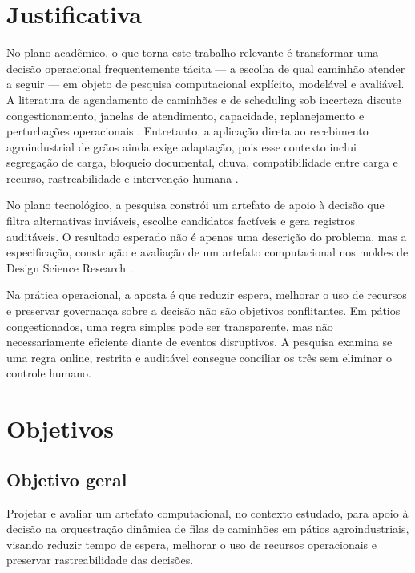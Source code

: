 \documentclass[
  12pt,
  oneside,
  a4paper,
  sumario=tradicional,
  brazil
]{abntex2}
\begin{document}
\chapter{Justificativa}

No plano acad\^emico, o que torna este trabalho relevante \'e transformar uma decis\~ao operacional frequentemente t\'acita --- a escolha de qual caminh\~ao atender a seguir --- em objeto de pesquisa computacional expl\'icito, model\'avel e avali\'avel. A literatura de agendamento de caminh\~oes e de scheduling sob incerteza discute congestionamento, janelas de atendimento, capacidade, replanejamento e perturba\c{c}\~oes operacionais \cite{Abdelmagid2022,Phan2016,Xu2022}. Entretanto, a aplica\c{c}\~ao direta ao recebimento agroindustrial de gr\~aos ainda exige adapta\c{c}\~ao, pois esse contexto inclui segrega\c{c}\~ao de carga, bloqueio documental, chuva, compatibilidade entre carga e recurso, rastreabilidade e interven\c{c}\~ao humana \cite{LeBlanc1978,Ingles2006,Dyck2023}.

No plano tecnol\'ogico, a pesquisa constr\'oi um artefato de apoio \`a decis\~ao que filtra alternativas invi\'aveis, escolhe candidatos fact\'iveis e gera registros audit\'aveis. O resultado esperado n\~ao \'e apenas uma descri\c{c}\~ao do problema, mas a especifica\c{c}\~ao, constru\c{c}\~ao e avalia\c{c}\~ao de um artefato computacional nos moldes de Design Science Research \cite{Hevner2004,Peffers2007,VanDerHeyden1985}.

Na pr\'atica operacional, a aposta \'e que reduzir espera, melhorar o uso de recursos e preservar governan\c{c}a sobre a decis\~ao n\~ao s\~ao objetivos conflitantes. Em p\'atios congestionados, uma regra simples pode ser transparente, mas n\~ao necessariamente eficiente diante de eventos disruptivos. A pesquisa examina se uma regra online, restrita e audit\'avel consegue conciliar os tr\^es sem eliminar o controle humano.

\chapter{Objetivos}

\section{Objetivo geral}
Projetar e avaliar um artefato computacional, no contexto estudado, para apoio \`a decis\~ao na orquestra\c{c}\~ao din\^amica de filas de caminh\~oes em p\'atios agroindustriais, visando reduzir tempo de espera, melhorar o uso de recursos operacionais e preservar rastreabilidade das decis\~oes.
\end{document}
